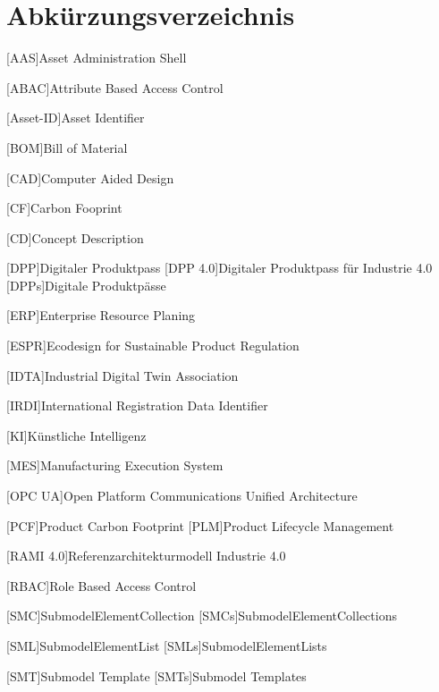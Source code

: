 \section*{Abkürzungsverzeichnis}
\begin{singlespacing}
\end{singlespacing}
\begin{acronym}

[AAS]{Asset Administration Shell}

[ABAC]{Attribute Based Access Control}

[Asset-ID]{Asset Identifier}

[BOM]{Bill of Material}

[CAD]{Computer Aided Design}

[CF]{Carbon Fooprint}

[CD]{Concept Description}

[DPP]{Digitaler Produktpass}
[DPP 4.0]{Digitaler Produktpass für Industrie 4.0}
[DPPs]{Digitale Produktpässe}

[ERP]{Enterprise Resource Planing}

[ESPR]{Ecodesign for Sustainable Product Regulation}

[IDTA]{Industrial Digital Twin Association}

[IRDI]{International Registration Data Identifier}

[KI]{Künstliche Intelligenz}

[MES]{Manufacturing Execution System}

[OPC UA]{Open Platform Communications Unified Architecture}

[PCF]{Product Carbon Footprint}
[PLM]{Product Lifecycle Management}

[RAMI 4.0]{Referenzarchitekturmodell Industrie 4.0}

[RBAC]{Role Based Access Control}

[SMC]{SubmodelElementCollection}
[SMCs]{SubmodelElementCollections}

[SML]{SubmodelElementList}
[SMLs]{SubmodelElementLists}

[SMT]{Submodel Template}
[SMTs]{Submodel Templates}

\end{acronym}



\newpage